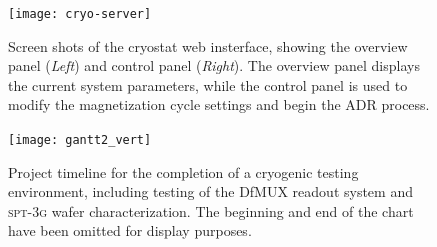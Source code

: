 \documentclass[preprint]{aastex}
\begin{document}
\begin{thebibliography}{dummy}
	\begin{figure}
		\texttt{[image: cryo-server]}
		\centering
		\caption{Screen shots of the cryostat web insterface, showing the overview panel (\textit{Left}) and control panel (\textit{Right}).  The overview panel displays the current system parameters, while the control panel is used to modify the magnetization cycle settings and begin the ADR process.}
		\label{web}
	\end{figure}

	\begin{figure}
		\texttt{[image: gantt2\_vert]}
		\centering
		\caption{Project timeline for the completion of a cryogenic testing environment, including testing of the DfMUX readout system and \textsc{spt-3g} wafer characterization.  The beginning and end of the  chart have been omitted for display purposes.}
		\label{gantt}
	\end{figure}

\end{thebibliography}
\end{document}
